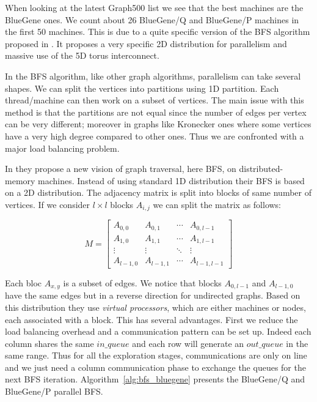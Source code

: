When looking at the latest Graph500 list we see that the best machines are the BlueGene ones. 
We count about 26 BlueGene/Q and BlueGene/P machines in the first 50  machines.
This is due to a quite specific version of the BFS algorithm proposed in \cite{6468459}. 
It proposes a very specific 2D distribution for parallelism and massive use of the 5D torus interconnect. 

In the BFS algorithm, like other graph algorithms, parallelism can take several shapes. 
We can split the vertices into partitions using 1D partition. 
Each thread/machine can then work on a subset of vertices. 
The main issue with this method is that the partitions are not equal since the number of edges per vertex can be very different; 
moreover in graphs like Kronecker ones where some vertices have a very high degree compared to other ones.
Thus we are confronted with a major load balancing problem. 

In \cite{6468459} they propose a new vision of graph traversal, here BFS, on distributed-memory machines. 
Instead of using standard 1D distribution their BFS is based on a 2D distribution. 
The adjacency matrix is split into blocks of same number of vertices.
If we consider $l\times l$ blocks $A_{i,j}$ we can split the matrix as follows:

\[ M = \left[ \begin{array}{cccc}
A_{0,0} & A_{0,1} & \cdots & A_{0,l-1} \\
A_{1,0} & A_{1,1} & \cdots & A_{1,l-1} \\
\vdots  & \vdots  & \ddots & \vdots    \\
A_{l-1,0} & A_{l-1,1}  & \cdots & A_{l-1,l-1} \end{array} \right] \] 

Each bloc $A_{x,y}$ is a subset of edges. 
We notice that blocks $A_{0,l-1}$ and $A_{l-1,0}$ have the same edges but in a reverse direction for undirected graphs. 
Based on this distribution they use \textit{virtual processors}, which are either machines or nodes, each associated with a block.
This has several advantages.
First we reduce the load balancing overhead and a communication pattern can be set up. 
Indeed each column shares the same $in\_queue$ and each row will generate an $out\_queue$ in the same range. 
Thus for all the exploration stages, communications are only on line and we just need a column communication phase to exchange the queues for the next BFS iteration.  
Algorithm~\ref{alg:bfs_bluegene} presents the BlueGene/Q and BlueGene/P parallel BFS.


